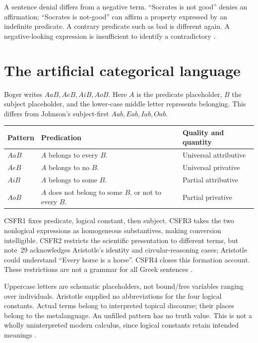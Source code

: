 A sentence denial differs from a negative term.
\enquote{Socrates is not good} denies an affirmation;
\enquote{Socrates is not-good} can affirm a property expressed by an
indefinite predicate. A contrary predicate such as bad is different again.
A negative-looking expression is insufficient to identify a contradictory
\parencite[pp.~124--128, 131--136]{Boger2004UnderlyingLogic}.

\section{The artificial categorical language}
\label{sec:p13-boger-categorical-grammar}

Boger writes \(AaB,AeB,AiB,AoB\). Here \(A\) is the predicate placeholder,
\(B\) the subject placeholder, and the lower-case middle letter represents
belonging. This differs from Johnson's subject-first \(Aab,Eab,Iab,Oab\).

\begin{tabularx}{\textwidth}{@{}l X X@{}}
\toprule
Pattern & Predication & Quality and quantity\\
\midrule
\(AaB\) & \(A\) belongs to every \(B\). & Universal attributive\\
\(AeB\) & \(A\) belongs to no \(B\). & Universal privative\\
\(AiB\) & \(A\) belongs to some \(B\). & Partial attributive\\
\(AoB\) & \(A\) does not belong to some \(B\), or not to every \(B\). & Partial privative\\
\bottomrule
\end{tabularx}

CSFR1 fixes predicate, logical constant, then subject. CSFR3 takes the
two nonlogical expressions as homogeneous substantives, making conversion
intelligible. CSFR2 restricts the scientific presentation to different
terms, but note~29 acknowledges Aristotle's identity and circular-reasoning
cases; Aristotle could understand \enquote{Every horse is a horse}.
CSFR4 closes this formation account. These restrictions are not a grammar
for all Greek sentences \parencite[pp.~128--133]{Boger2004UnderlyingLogic}.

Uppercase letters are schematic placeholders, not bound/free variables
ranging over individuals. Aristotle supplied no abbreviations for the
four logical constants. Actual terms belong to interpreted topical
discourse; their places belong to the metalanguage. An unfilled pattern
has no truth value. This is not a wholly uninterpreted modern calculus,
since logical constants retain intended meanings
\parencite[pp.~141--144]{Boger2004UnderlyingLogic}.

